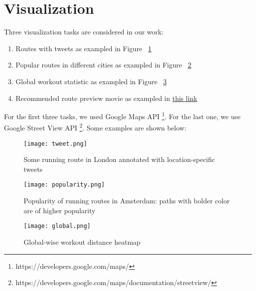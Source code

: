 \section{Visualization}

Three visualization tasks are considered in our work: 

\begin{enumerate}
\item Routes with tweets as exampled in Figure ~\ref{viz:social}
\item Popular routes in different cities as exampled in Figure ~\ref{viz:popularity}
\item Global workout statistic as exampled in Figure ~\ref{viz:global}
\item Recommended route preview movie as exampled in \href{http://www.cs.helsinki.fi/u/hxiao/ah/viz/route\_animation/examples/movie.html#route_path=london\_route.json}{this link}
\end{enumerate}

For the first three tasks, we used Google Maps API \footnote{https://developers.google.com/maps/}. For the last one, we use Google Street View API \footnote{https://developers.google.com/maps/documentation/streetview/}.
Some examples are shown below:


\begin{figure}[h]
\centering
\texttt{[image: tweet.png]}
\caption{Some running route in London annotated with location-specific tweets \label{viz:social}}
\end{figure}

\begin{figure}[h]
\centering
\texttt{[image: popularity.png]}
\caption{Popularity of running routes in Amsterdam: paths with bolder color are of higher popularity  \label{viz:popularity}}
\end{figure}

\begin{figure}[h]
\centering
\texttt{[image: global.png]}
\caption{Global-wise workout distance heatmap \label{viz:global}}
\end{figure}